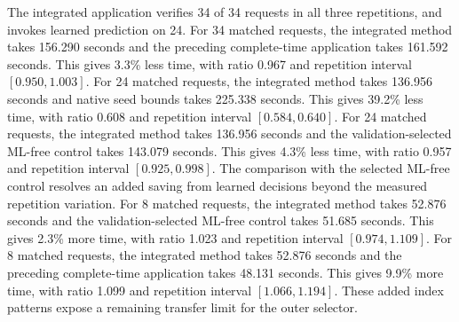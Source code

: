 The integrated application verifies 34 of 34 requests in all three repetitions, and invokes learned prediction on 24. For 34 matched requests, the integrated method takes 156.290 seconds and the preceding complete-time application takes 161.592 seconds. This gives 3.3\% less time, with ratio 0.967 and repetition interval $[0.950,1.003]$. For 24 matched requests, the integrated method takes 136.956 seconds and native seed bounds takes 225.338 seconds. This gives 39.2\% less time, with ratio 0.608 and repetition interval $[0.584,0.640]$. For 24 matched requests, the integrated method takes 136.956 seconds and the validation-selected ML-free control takes 143.079 seconds. This gives 4.3\% less time, with ratio 0.957 and repetition interval $[0.925,0.998]$. The comparison with the selected ML-free control resolves an added saving from learned decisions beyond the measured repetition variation. For 8 matched requests, the integrated method takes 52.876 seconds and the validation-selected ML-free control takes 51.685 seconds. This gives 2.3\% more time, with ratio 1.023 and repetition interval $[0.974,1.109]$. For 8 matched requests, the integrated method takes 52.876 seconds and the preceding complete-time application takes 48.131 seconds. This gives 9.9\% more time, with ratio 1.099 and repetition interval $[1.066,1.194]$. These added index patterns expose a remaining transfer limit for the outer selector.


